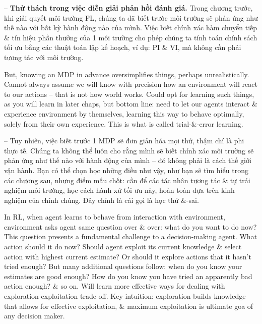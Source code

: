 \documentclass{article}
\begin{document}
\begin{itemize}
\begin{itemize}
        -- {\bf Thử thách trong việc diễn giải phản hồi đánh giá.} Trong chương trước, khi giải quyết môi trường FL, chúng ta đã biết trước môi trường sẽ phản ứng như thế nào với bất kỳ hành động nào của mình. Việc biết chính xác hàm chuyển tiếp \& tín hiệu phần thưởng của 1 môi trường cho phép chúng ta tính toán chính sách tối ưu bằng các thuật toán lập kế hoạch, ví dụ: PI \& VI, mà không cần phải tương tác với môi trường.

        But, knowing an MDP in advance oversimplifies things, perhaps unrealistically. Cannot always assume we will know with precision how an environment will react to our actions -- that is not how world works. Could opt for learning such things, as you will learn in later chaps, but bottom line: need to let our agents interact \& experience environment by themselves, learning this way to behave optimally, solely from their own experience. This is what is called trial-\&-error learning.

        -- Tuy nhiên, việc biết trước 1 MDP sẽ đơn giản hóa mọi thứ, thậm chí là phi thực tế. Chúng ta không thể luôn cho rằng mình sẽ biết chính xác môi trường sẽ phản ứng như thế nào với hành động của mình -- đó không phải là cách thế giới vận hành. Bạn có thể chọn học những điều như vậy, như bạn sẽ tìm hiểu trong các chương sau, nhưng điểm mấu chốt: cần để các tác nhân tương tác \& tự trải nghiệm môi trường, học cách hành xử tối ưu này, hoàn toàn dựa trên kinh nghiệm của chính chúng. Đây chính là cái gọi là học thử \&-sai.

        In RL, when agent learns to behave from interaction with environment, environment asks agent same question over \& over: what do you want to do now? This question presents a fundamental challenge to a decision-making agent. What action should it do now? Should agent exploit its current knowledge \& select action with highest current estimate? Or should it explore actions that it hasn't tried enough? But many additional questions follow: when do you know your estimates are good enough? How do you know you have tried an apparently bad action enough? \& so on. Will learn more effective ways for dealing with exploration-exploitation trade-off. Key intuition: exploration builds knowledge that allows for effective exploitation, \& maximum exploitation is ultimate goa of any decision maker.


\end{itemize}
\end{itemize}
\end{document}
